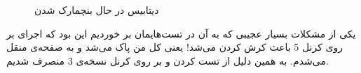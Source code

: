 \begin{figure}[ht]
    \caption{دیتابیس در حال بنچمارک شدن}
    \label{fig:postgres:baremetal:database:benchmark}
\end{figure}

یکی از مشکلات بسیار عجیبی که به آن در تست‌هایمان بر خوردیم این بود که اجرای
بر روی کرنل 5 باعث کرش کردن
می‌شد! یعنی کل
من پاک می‌شد و به صفحه‌ی
منقل می‌شدم. به همین دلیل از تست کردن
 و 
بر روی کرنل نسخه‌ی 3 منصرف شدیم.
